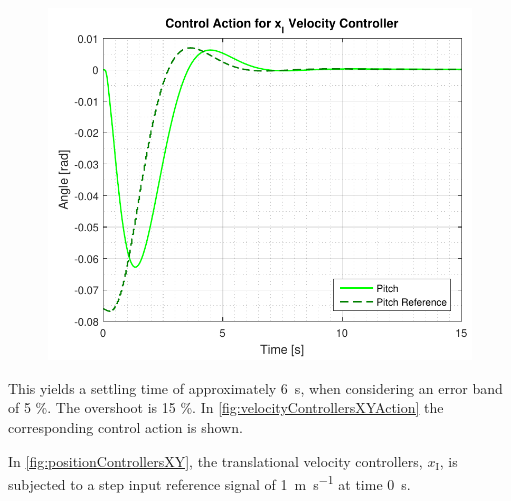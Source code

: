 \begin{minipage}{\linewidth}
    \begin{minipage}{0.46\linewidth}
        \begin{figure}[H]
            \includegraphics[scale=.5]{figures/velocityControllersXYAction}
            \centering
            \label{fig:velocityControllersXYAction}
        \end{figure}
    \end{minipage}
\end{minipage}

This yields a settling time of approximately \SI{6}{s}, when considering an error band of 5 \%. The overshoot is 15 \%. In \autoref{fig:velocityControllersXYAction} the corresponding control action is shown.

In \autoref{fig:positionControllersXY}, the translational velocity controllers, $x_{\mathrm{I}}$, is subjected to a step input reference signal of \SI{1}{m s^{-1}} at time \SI{0}{s}.

